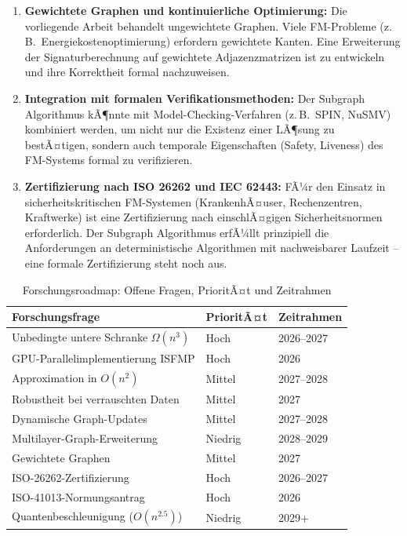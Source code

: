 ﻿\documentclass[a4paper,12pt]{article}
\theoremstyle{definition}
\begin{document}
\begin{enumerate}
\item \textbf{Gewichtete Graphen und kontinuierliche Optimierung:}
      Die vorliegende Arbeit behandelt ungewichtete Graphen.
      Viele FM-Probleme (z.\,B.\ Energiekostenoptimierung) erfordern gewichtete
      Kanten. Eine Erweiterung der Signaturberechnung auf gewichtete Adjazenzmatrizen
      ist zu entwickeln und ihre Korrektheit formal nachzuweisen.

\item \textbf{Integration mit formalen Verifikationsmethoden:}
      Der Subgraph Algorithmus kÃ¶nnte mit Model-Checking-Verfahren
      (z.\,B.\ SPIN, NuSMV) kombiniert werden, um nicht nur die Existenz
      einer LÃ¶sung zu bestÃ¤tigen, sondern auch temporale Eigenschaften
      (Safety, Liveness) des FM-Systems formal zu verifizieren.

\item \textbf{Zertifizierung nach ISO 26262 und IEC 62443:}
      FÃ¼r den Einsatz in sicherheitskritischen FM-Systemen (KrankenhÃ¤user,
      Rechenzentren, Kraftwerke) ist eine Zertifizierung nach einschlÃ¤gigen
      Sicherheitsnormen erforderlich. Der Subgraph Algorithmus erfÃ¼llt
      prinzipiell die Anforderungen an deterministische Algorithmen mit
      nachweisbarer Laufzeit -- eine formale Zertifizierung steht noch aus.

\end{enumerate}

\begin{table}[ht]
\centering
\caption{Forschungsroadmap: Offene Fragen, PrioritÃ¤t und Zeitrahmen}
\label{tab:roadmap}
\begin{tabular}{p{5.5cm} l l}
\toprule
\textbf{Forschungsfrage} & \textbf{PrioritÃ¤t} & \textbf{Zeitrahmen} \\
\midrule
Unbedingte untere Schranke $\Omega(n^3)$       & Hoch     & 2026--2027 \\
GPU-Parallelimplementierung ISFMP              & Hoch     & 2026       \\
Approximation in $O(n^2)$                     & Mittel   & 2027--2028 \\
Robustheit bei verrauschten Daten             & Mittel   & 2027       \\
Dynamische Graph-Updates                      & Mittel   & 2027--2028 \\
Multilayer-Graph-Erweiterung                  & Niedrig  & 2028--2029 \\
Gewichtete Graphen                            & Mittel   & 2027       \\
ISO-26262-Zertifizierung                      & Hoch     & 2026--2027 \\
ISO-41013-Normungsantrag                      & Hoch     & 2026       \\
Quantenbeschleunigung ($O(n^{2.5})$)          & Niedrig  & 2029+      \\
\bottomrule
\end{tabular}
\end{table}
\end{document}
